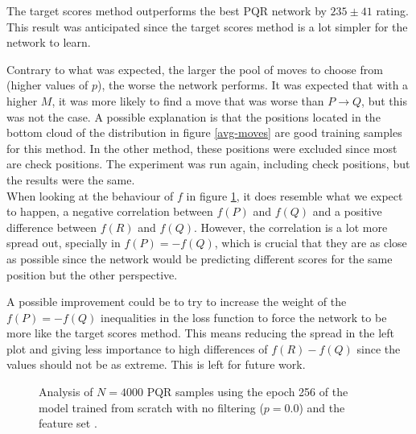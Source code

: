 The target scores method outperforms the best PQR network by $235 \pm 41$ rating. This result was anticipated since the target scores method is a lot simpler for the network to learn.

Contrary to what was expected, the larger the pool of moves to choose from (higher values of $p$), the worse the network performs. It was expected that with a higher $M$, it was more likely to find a move that was worse than $P \rightarrow Q$, but this was not the case. A possible explanation is that the positions located in the bottom cloud of the distribution in figure \ref{avg-moves} are good training samples for this method. In the other method, these positions were excluded since most are check positions. The experiment was run again, including check positions, but the results were the same. \\

\newpage
When looking at the behaviour of $f$ in figure \ref{pqr-scratch}, it does resemble what we expect to happen, a negative correlation between $f(P)$ and $f(Q)$ and a positive difference between $f(R)$ and $f(Q)$. However, the correlation is a lot more spread out, specially in \mbox{$f(P)=-f(Q)$}, which is crucial that they are as close as possible since the network would be predicting different scores for the same position but the other perspective.

A possible improvement could be to try to increase the weight of the \mbox{$f(P)=-f(Q)$} inequalities in the loss function to force the network to be more like the target scores method. This means reducing the spread in the left plot and giving less importance to high differences of \mbox{$f(R)-f(Q)$} since the values should not be as extreme. This is left for future work.

\begin{figure}[H]
\centering
{}
\caption{Analysis of $N=4000$ PQR samples using the epoch 256 of the model trained from scratch with no filtering ($p=0.0$) and the feature set .}
\label{pqr-scratch}
\end{figure}

